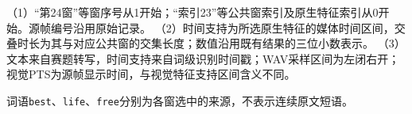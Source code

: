 \begin{table}[H]
\par\vspace{0.35em}\begin{minipage}{\textwidth}\setlength{\parindent}{0pt}
（1）“第24窗”等窗序号从1开始；“索引23”等公共窗索引及原生特征索引从0开始。源帧编号沿用原始记录。
（2）时间支持为所选原生特征的媒体时间区间，交叠时长为其与对应公共窗的交集长度；数值沿用既有结果的三位小数表示。
（3）文本来自赛题转写，时间支持来自词级识别时间戳；WAV采样区间为左闭右开；视觉PTS为源帧显示时间，与视觉特征支持区间含义不同。\par
\noindent 词语\texttt{best}、\texttt{life}、\texttt{free}分别为各窗选中的来源，不表示连续原文短语。

\end{minipage}

\endgroup
\end{table}
